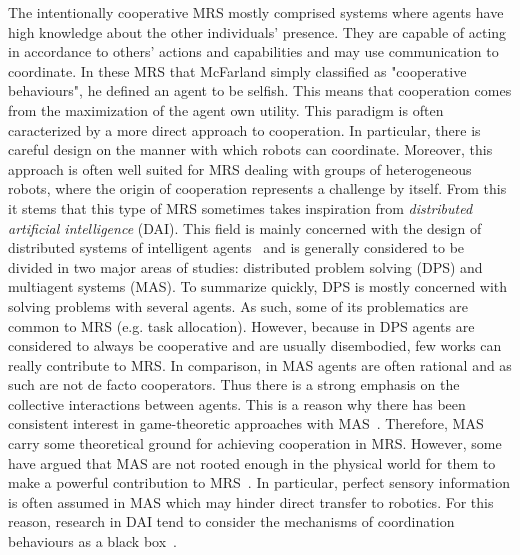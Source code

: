 
    The intentionally cooperative MRS mostly comprised systems where agents have high knowledge about the other individuals' presence. They are capable of acting in accordance to others' actions and capabilities and may use communication to coordinate. In these MRS that McFarland simply classified as "cooperative behaviours", he defined an agent to be selfish. This means that cooperation comes from the maximization of the agent own utility. This paradigm is often caracterized by a more direct approach to cooperation. In particular, there is careful design on the manner with which robots can coordinate. Moreover, this approach is often well suited for MRS dealing with groups of heterogeneous robots, where the origin of cooperation represents a challenge by itself. From this it stems that this type of MRS sometimes takes inspiration from \emph{distributed artificial intelligence} (DAI). This field is mainly concerned with the design of distributed systems of intelligent agents~\parencite{Cao1997, Panait2005} and is generally considered to be divided in two major areas of studies: distributed problem solving (DPS) and multiagent systems (MAS). To summarize quickly, DPS is mostly concerned with solving problems with several agents. As such, some of its problematics are common to MRS (e.g. task allocation). However, because in DPS agents are considered to always be cooperative and are usually disembodied, few works can really contribute to MRS. In comparison, in MAS agents are often rational and as such are not de facto cooperators. Thus there is a strong emphasis on the collective interactions between agents. This is a reason why there has been consistent interest in game-theoretic approaches with MAS~\parencite{Rosenschein1985}. Therefore, MAS carry some theoretical ground for achieving cooperation in MRS. However, some have argued that MAS are not rooted enough in the physical world for them to make a powerful contribution to MRS~\parencite{Cao1997, Farinelli2004}. In particular, perfect sensory information is often assumed in MAS which may hinder direct transfer to robotics. For this reason, research in DAI tend to consider the mechanisms of coordination behaviours as a black box~\parencite{Parker1994}.



